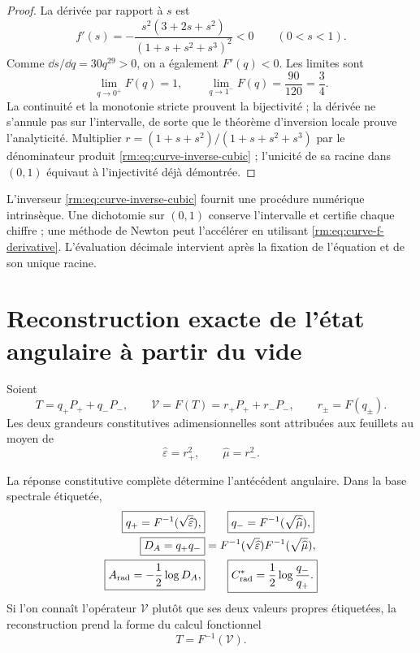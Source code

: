 \begin{proof}
La dérivée par rapport à \(s\) est
\begin{equation}
 f'(s)
 =-\frac{s^2(3+2s+s^2)}{(1+s+s^2+s^3)^2}<0
 \qquad(0<s<1).
 \label{rm:eq:curve-f-derivative}
\end{equation}
Comme \(\dd s/\dd q=30q^{29}>0\), on a également \(F'(q)<0\). Les limites sont
\[
 \lim_{q\to0^+}F(q)=1,
 \qquad
 \lim_{q\to1^-}F(q)=\frac{90}{120}=\frac34.
\]
La continuité et la monotonie stricte prouvent la bijectivité ; la dérivée ne s’annule pas sur l’intervalle, de sorte que le théorème d’inversion locale prouve l’analyticité. Multiplier \(r=(1+s+s^2)/(1+s+s^2+s^3)\) par le dénominateur produit \cref{rm:eq:curve-inverse-cubic} ; l’unicité de sa racine dans \((0,1)\) équivaut à l’injectivité déjà démontrée.
\end{proof}

L’inverseur \cref{rm:eq:curve-inverse-cubic} fournit une procédure numérique intrinsèque. Une dichotomie sur \((0,1)\) conserve l’intervalle et certifie chaque chiffre ; une méthode de Newton peut l’accélérer en utilisant \cref{rm:eq:curve-f-derivative}. L’évaluation décimale intervient après la fixation de l’équation et de son unique racine.

\section{Reconstruction exacte de l’état angulaire à partir du vide}

Soient
\begin{equation}
 T=q_+P_++q_-P_-,
 \qquad
 \mathcal V=F(T)=r_+P_++r_-P_-,
 \qquad
 r_\pm=F(q_\pm).
 \label{rm:eq:curve-T-V}
\end{equation}
Les deux grandeurs constitutives adimensionnelles sont attribuées aux feuillets au moyen de
\begin{equation}
 \widehat\varepsilon=r_+^2,
 \qquad
 \widehat\mu=r_-^2.
 \label{rm:eq:curve-mu-epsilon}
\end{equation}

\begin{theorem}
\label{rm:thm:curve-vacuum-tomography} La réponse constitutive complète détermine l’antécédent angulaire. Dans la base spectrale étiquetée,
\begin{align}
 \boxed{q_+=F^{-1}(\sqrt{\widehat\varepsilon}),}
 &\qquad
 \boxed{q_-=F^{-1}(\sqrt{\widehat\mu}),}
 \label{rm:eq:curve-recover-qpm}\\
 \boxed{D_A=q_+q_-}
 &=F^{-1}(\sqrt{\widehat\varepsilon})
   F^{-1}(\sqrt{\widehat\mu}),
 \label{rm:eq:curve-recover-DA}\\
 \boxed{A_{\rm rad}=-\frac12\log D_A,}
 &\qquad
 \boxed{C^*_{\rm rad}=\frac12\log\frac{q_-}{q_+}.}
 \label{rm:eq:curve-recover-A-C}
\end{align}
Si l’on connaît l’opérateur \(\mathcal V\) plutôt que ses deux valeurs propres étiquetées, la reconstruction prend la forme du calcul fonctionnel
\begin{equation}
 \boxed{T=F^{-1}(\mathcal V).}
 \label{rm:eq:curve-functional-inverse}
\end{equation}
\end{theorem}

